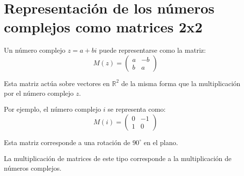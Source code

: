 \section{Representación de los números complejos como matrices 2x2}\label{sec:complejos}
Un número complejo $z = a + bi$ puede representarse como la matriz:
\begin{equation}\label{eq:matriz_complejo}
M(z) = \begin{pmatrix}
a & -b \\
b & a
\end{pmatrix}
\end{equation}

Esta matriz actúa sobre vectores en $\mathbb{R}^2$ de la misma forma que la multiplicación por el número complejo $z$.

Por ejemplo, el número complejo $i$ se representa como:
\begin{equation}\label{eq:matriz_i}
M(i) = \begin{pmatrix}
0 & -1 \\
1 & 0
\end{pmatrix}
\end{equation}

Esta matriz corresponde a una rotación de $90^\circ$ en el plano.

La multiplicación de matrices de este tipo corresponde a la multiplicación de números complejos.
